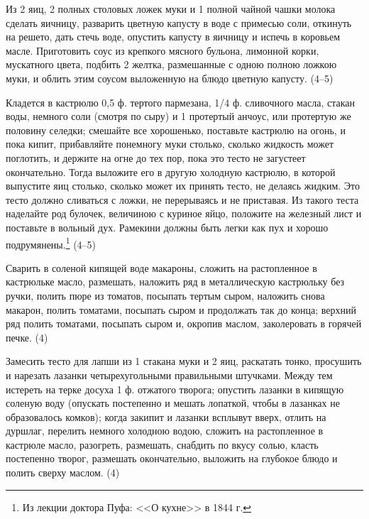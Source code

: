 
Из 2 яиц, 2 полных столовых ложек муки и 1 полной чайной чашки молока сделать яичницу, разварить цветную капусту в воде с примесью соли, откинуть на решето, дать стечь воде, опустить капусту в яичницу и испечь в коровьем масле. Приготовить соус из крепкого мясного бульона, лимонной корки, мускатного цвета, подбить 2 желтка, размешанные с одною полною ложкою муки, и облить этим соусом выложенную на блюдо цветную капусту. (4--5) 


Кладется в кастрюлю 0,5 ф. тертого пармезана, 1/4 ф. сливочного масла, стакан воды, немного соли (смотря по сыру) и 1 протертый анчоус, или протертую же половину селедки; смешайте все хорошенько, поставьте кастрюлю на огонь, и пока кипит, прибавляйте понемногу муки столько, сколько жидкость может поглотить, и держите на огне до тех пор, пока это тесто не загустеет окончательно. Тогда выложите его в другую холодную кастрюлю, в которой выпустите яиц столько, сколько может их принять тесто, не делаясь жидким. Это тесто должно сливаться с ложки, не перерываясь и не приставая. Из такого теста наделайте род булочек, величиною с куриное яйцо, положите на железный лист и поставьте в вольный дух. Рамекини должны быть легки как пух и хорошо подрумянены.\footnote{Из лекции доктора Пуфа: <<О кухне>> в 1844 г.} (4--5) 


Сварить в соленой кипящей воде макароны, сложить на растопленное в кастрюльке масло, размешать, наложить ряд в металлическую кастрюльку без ручки, полить пюре из томатов, посыпать тертым сыром, наложить снова макарон, полить томатами, посыпать сыром и продолжать так до конца; верхний ряд полить томатами, посыпать сыром и, окропив маслом, заколеровать в горячей печке. (4) 


Замесить тесто для лапши из 1 стакана муки и 2 яиц, раскатать тонко, просушить и нарезать лазанки четырехугольными правильными штучками. Между тем истереть на терке досуха 1 ф. отжатого творога; опустить лазанки в кипящую соленую воду (опускать постепенно и мешать лопаткой, чтобы в лазанках не образовалось комков); когда закипит и лазанки всплывут вверх, отлить на дуршлаг, перелить немного холодною водою, сложить на растопленное в кастрюле масло, разогреть, размешать, снабдить по вкусу солью, класть постепенно творог, размешать окончательно, выложить на глубокое блюдо и полить сверху маслом. (4) 

